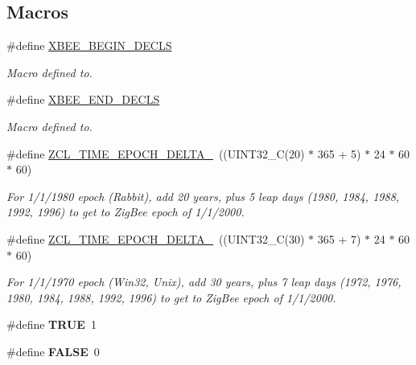\subsection*{Macros}
\begin{DoxyCompactItemize}
\item 
\#define \hyperlink{group__hal_ga336bff4f4a6012aacc4468132bbd3d7f}{X\+B\+E\+E\+\_\+\+B\+E\+G\+I\+N\+\_\+\+D\+E\+C\+LS}
\begin{DoxyCompactList}\small\item\em Macro defined to. \end{DoxyCompactList}\item 
\#define \hyperlink{group__hal_ga8d7f5a691878e9ffb7da396899581062}{X\+B\+E\+E\+\_\+\+E\+N\+D\+\_\+\+D\+E\+C\+LS}
\begin{DoxyCompactList}\small\item\em Macro defined to. \end{DoxyCompactList}\item 
\#define \hyperlink{group__hal_gaa1c89a351daab5e3d33a2dc48f85f9a4}{Z\+C\+L\+\_\+\+T\+I\+M\+E\+\_\+\+E\+P\+O\+C\+H\+\_\+\+D\+E\+L\+T\+A\+\_}~((U\+I\+N\+T32\+\_\+C(20) $\ast$ 365 + 5) $\ast$ 24 $\ast$ 60 $\ast$ 60)
\begin{DoxyCompactList}\small\item\em For 1/1/1980 epoch (Rabbit), add 20 years, plus 5 leap days (1980, 1984, 1988, 1992, 1996) to get to Zig\+Bee epoch of 1/1/2000. \end{DoxyCompactList}\item 
\#define \hyperlink{group__hal_ga735b0974380a73e9d7a12a1f199a5921}{Z\+C\+L\+\_\+\+T\+I\+M\+E\+\_\+\+E\+P\+O\+C\+H\+\_\+\+D\+E\+L\+T\+A\+\_}~((U\+I\+N\+T32\+\_\+C(30) $\ast$ 365 + 7) $\ast$ 24 $\ast$ 60 $\ast$ 60)
\begin{DoxyCompactList}\small\item\em For 1/1/1970 epoch (Win32, Unix), add 30 years, plus 7 leap days (1972, 1976, 1980, 1984, 1988, 1992, 1996) to get to Zig\+Bee epoch of 1/1/2000. \end{DoxyCompactList}\item 
\mbox{\label{group__hal_gaa8cecfc5c5c054d2875c03e77b7be15d}} 
\#define {\bfseries T\+R\+UE}~1
\item 
\mbox{\label{group__hal_gaa93f0eb578d23995850d61f7d61c55c1}} 
\#define {\bfseries F\+A\+L\+SE}~0
\item 
\mbox{\label{group__hal_ga844d3ad124d3502c66cac1ce2f86ca72}} 

\end{DoxyCompactItemize}
